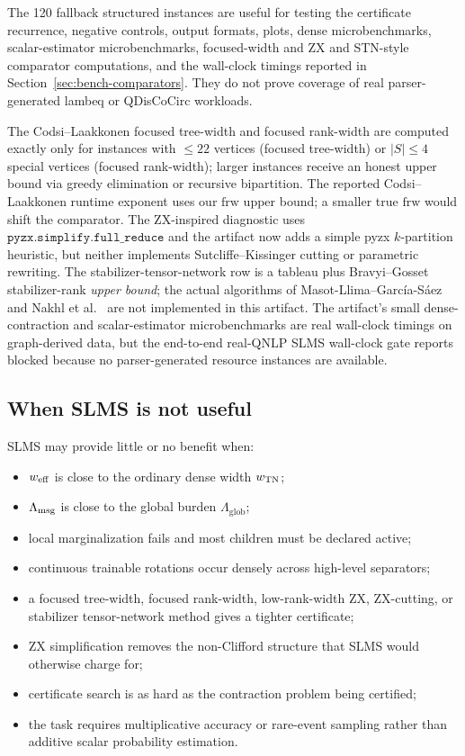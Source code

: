 The 120 fallback structured instances are useful for testing the certificate recurrence, negative controls, output formats, plots, dense microbenchmarks, scalar-estimator microbenchmarks, focused-width and ZX and STN-style comparator computations, and the wall-clock timings reported in Section~\ref{sec:bench-comparators}. They do not prove coverage of real parser-generated lambeq or QDisCoCirc workloads.

The Codsi--Laakkonen focused tree-width and focused rank-width are computed exactly only for instances with \(\le 22\) vertices (focused tree-width) or \(|S|\le 4\) special vertices (focused rank-width); larger instances receive an honest upper bound via greedy elimination or recursive bipartition. The reported Codsi--Laakkonen runtime exponent uses our \(\mathrm{frw}\) upper bound; a smaller true \(\mathrm{frw}\) would shift the comparator. The ZX-inspired diagnostic uses \(\mathtt{pyzx.simplify.full\_reduce}\) and the artifact now adds a simple pyzx \(k\)-partition heuristic, but neither implements Sutcliffe--Kissinger cutting or parametric rewriting. The stabilizer-tensor-network row is a tableau plus Bravyi--Gosset stabilizer-rank \emph{upper bound}; the actual algorithms of Masot-Llima--Garc\'ia-S\'aez \citep{MasotLlimaGarciaSaez2024} and Nakhl et al.\ \citep{NakhlEtAl2025} are not implemented in this artifact. The artifact's small dense-contraction and scalar-estimator microbenchmarks are real wall-clock timings on graph-derived data, but the end-to-end real-QNLP SLMS wall-clock gate reports blocked because no parser-generated resource instances are available.

\subsection{When SLMS is not useful}

SLMS may provide little or no benefit when:
\begin{itemize}[leftmargin=1.2cm]
\item \(w_{\mathrm{eff}}\) is close to the ordinary dense width \(w_{\mathrm{TN}}\);
\item \(\Lambda_{\mathrm{msg}}\) is close to the global burden \(\Lambda_{\mathrm{glob}}\);
\item local marginalization fails and most children must be declared active;
\item continuous trainable rotations occur densely across high-level separators;
\item a focused tree-width, focused rank-width, low-rank-width ZX, ZX-cutting, or stabilizer tensor-network method gives a tighter certificate;
\item ZX simplification removes the non-Clifford structure that SLMS would otherwise charge for;
\item certificate search is as hard as the contraction problem being certified;
\item the task requires multiplicative accuracy or rare-event sampling rather than additive scalar probability estimation.
\end{itemize}

